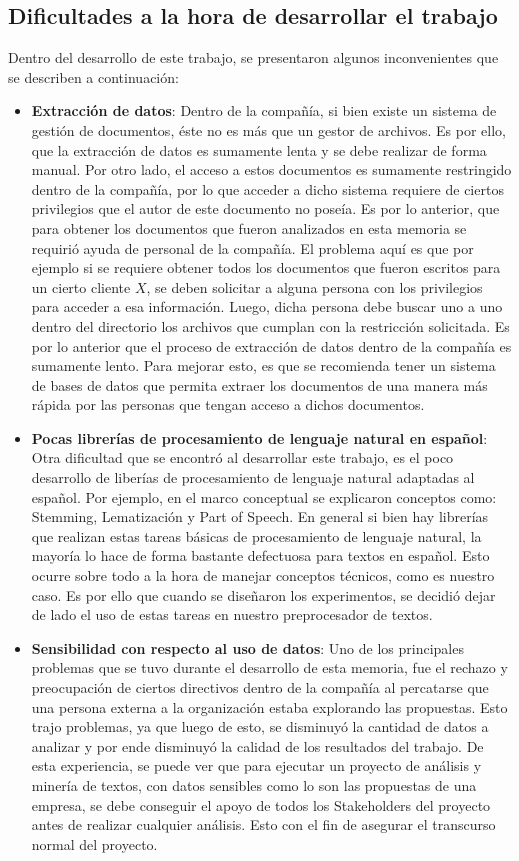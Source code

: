 \subsection{Dificultades a la hora de desarrollar el trabajo}
    Dentro del desarrollo de este trabajo, se presentaron algunos inconvenientes que se describen a continuación:
    \begin{itemize}
        \item \textbf{Extracción de datos}: Dentro de la compañía, si bien existe un sistema de gestión de documentos, éste no es más que un gestor de archivos. Es por ello, que la extracción de datos es sumamente lenta y se debe realizar de forma manual. Por otro lado, el acceso a estos documentos es sumamente restringido dentro de la compañía, por lo que acceder a dicho sistema requiere de ciertos privilegios que el autor de este documento no poseía. Es por lo anterior, que para obtener los documentos que fueron analizados en esta memoria se requirió ayuda de personal de la compañía. El problema aquí es que por ejemplo si se requiere obtener todos los documentos que fueron escritos para un cierto cliente $X$, se deben solicitar a alguna persona con los privilegios para acceder a esa información. Luego, dicha persona debe buscar uno a uno dentro del directorio los archivos que cumplan con la restricción solicitada. Es por lo anterior que el proceso de extracción de datos dentro de la compañía es sumamente lento. Para mejorar esto, es que se recomienda tener un sistema de bases de datos que permita extraer los documentos de una manera más rápida por las personas que tengan acceso a dichos documentos.
        \item \textbf{Pocas librerías de procesamiento de lenguaje natural en español}: Otra dificultad que se encontró al desarrollar este trabajo, es el poco desarrollo de liberías de procesamiento de lenguaje natural adaptadas al español. Por ejemplo, en el marco conceptual se explicaron conceptos como: Stemming, Lematización y Part of Speech. En general si bien hay librerías que realizan estas tareas básicas de procesamiento de lenguaje natural, la mayoría lo hace de forma bastante defectuosa para textos en español. Esto ocurre sobre todo a la hora de manejar conceptos técnicos, como es nuestro caso. Es por ello que cuando se diseñaron los experimentos, se decidió dejar de lado el uso de estas tareas en nuestro preprocesador de textos.
        \item \textbf{Sensibilidad con respecto al uso de datos}: Uno de los principales problemas que se tuvo durante el desarrollo de esta memoria, fue el rechazo y preocupación de ciertos directivos dentro de la compañía al percatarse que una persona externa a la organización estaba explorando las propuestas. Esto trajo problemas, ya que luego de esto, se disminuyó la cantidad de datos a analizar y por ende disminuyó la calidad de los resultados del trabajo. De esta experiencia, se puede ver que para ejecutar un proyecto de análisis y minería de textos, con datos sensibles como lo son las propuestas de una empresa, se debe conseguir el apoyo de todos los Stakeholders del proyecto antes de realizar cualquier análisis. Esto con el fin de asegurar el transcurso normal del proyecto.

\end{itemize}
